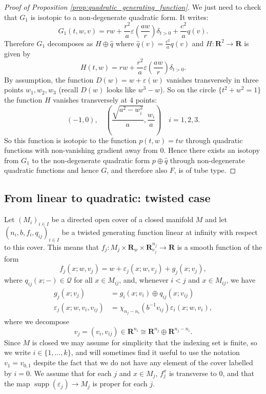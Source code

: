 \documentclass[reqno]{amsart}
\renewcommand{\epsilon}{\varepsilon}
\theoremstyle{theorem}
\theoremstyle{remark}
\theoremstyle{definition}
\DeclareMathOperator{\supp}{supp}
\newcommand{\R}{\mathbf{R}}
\newcommand{\QQ}{\mathcal{Q}}
\begin{document}
\begin{proof}[Proof of Proposition \ref{prop:quadratic_generating_function}]
We just need to check that $G_1$ is isotopic to a non-degenerate quadratic form.
It writes:
\[G_1(t,w,v)=rw+\frac{r^2}{a}\epsilon(\frac{aw}{r})\delta_{t>0}+ \frac{c^2}{a}q(v).\]
Therefore $G_1$ decomposes as $H\oplus \widehat{q}$
where $\widehat{q}(v)=\frac{c^2}{a}q(v)$ and $H:\R^2\to \R$ is given by
\[H(t,w)=rw+\frac{r^2}{a} \epsilon\left(\frac{aw}{r}\right)\delta_{t>0}.\]
By assumption, the function $D(w)=w+\varepsilon(w)$ vanishes transversely in three points $w_1,w_2,w_3$ (recall $D(w)$ looks like $w^3-w$).
So on the circle $\{t^2+w^2=1\}$ the function $H$ vanishes transversely at $4$ points: 
\[(-1,0),\quad \left(\frac{\sqrt{a^2-w_i^2}}{a}, \frac{w_i}{a}\right)\quad i=1,2,3.\]
So this function is
isotopic to the function $p(t,w)=tw$ through quadratic functions with non-vanishing gradient away from $0$.
Hence there exists an isotopy from $G_1$ to the non-degenerate quadratic form $p \oplus \widehat{q}$ through non-degenerate quadratic functions and hence $G$, and therefore also $F$, is of tube type. 
\end{proof}


\subsection{From linear to quadratic: twisted case}


Let  $(M_i)_{i\in I}$ be a directed open cover of a closed manifold $M$ and let $(n_i,b,f_i,q_{ij})_{i\in I}$ be a twisted generating function linear at infinity with respect to
this cover. This means that  $f_j:M_j\times \R_w \times \R^{n_j}_{v_j}\to \R$ is a smooth function of the form
\[f_j(x;w,v_j)=w+\epsilon_j(x;w,v_j)+g_j(x;v_j),\]
where $q_{ij}(x;-)\in\QQ$ for all $x\in M_{ij}$, and, whenever $i<j$ and $x \in M_{ij}$, we have
\begin{align}
  g_j(x;v_j) & =g_i(x;v_i)\oplus q_{ij}(x;v_{ij}) \\
  \epsilon_j(x;w,v_i,v_{ij})& =\chi_{n_j-n_i}(b^{-1}v_{ij})\epsilon_i(x;w,v_i),
\end{align}
where we decompose
\begin{equation}
  \label{eq:1}
  v_j=(v_i,v_{ij}) \in \R^{n_i} \cong \R^{n_j} \oplus \R^{n_j-n_i}.
\end{equation}
Since $M$ is closed we may assume for simplicity that the indexing set is finite, so we write $i \in \{1,\ldots,k\}$,  and will sometimes find it useful to use the notation $v_1=v_{0,1}$ despite the fact that we do not have any element of the cover labelled by $i=0$.
We assume that for each $j$ and $x\in M_j$, $f_j^x$ is transverse to $0$, and that the map $\supp(\epsilon_j)\to M_j$ is proper for each $j$.
\end{document}
